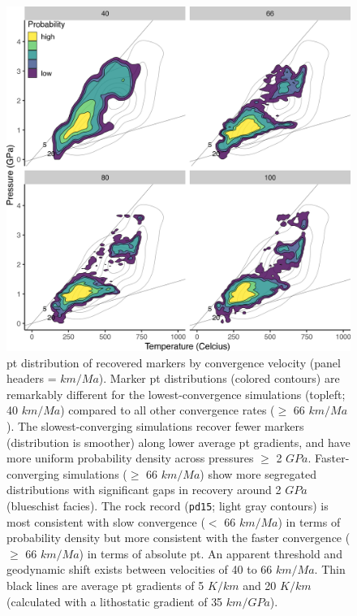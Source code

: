 \begin{figure}[htbp]

{\centering \includegraphics[width=1\linewidth,]{assets/figs/chpt4/cvDensity} 

}

\caption[\gls{pt} distribution of recovered markers by convergence velocity]{\gls{pt} distribution of recovered markers by convergence velocity (panel headers = \(km/Ma\)). Marker \gls{pt} distributions (colored contours) are remarkably different for the lowest-convergence simulations (topleft; 40 \(km/Ma\)) compared to all other convergence rates (\(\geq\) 66 \(km/Ma\)). The slowest-converging simulations recover fewer markers (distribution is smoother) along lower average \gls{pt} gradients, and have more uniform probability density across pressures \(\geq\) 2 \(GPa\). Faster-converging simulations (\(\geq\) 66 \(km/Ma\)) show more segregated distributions with significant gaps in recovery around 2 \(GPa\) (blueschist facies). The rock record (\texttt{pd15}; light gray contours) is most consistent with slow convergence (\(<\) 66 \(km/Ma\)) in terms of probability density but more consistent with the faster convergence (\(\geq\) 66 \(km/Ma\)) in terms of absolute \gls{pt}. An apparent threshold and geodynamic shift exists between velocities of 40 to 66 \(km/Ma\). Thin black lines are average \gls{pt} gradients of 5 \(K/km\) and 20 \(K/km\) (calculated with a lithostatic gradient of 35 \(km/GPa\)).}\label{fig:cvDensity}
\end{figure}

